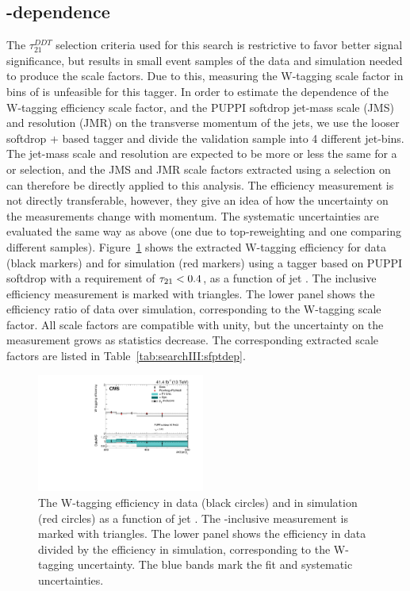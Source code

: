 \subsection{\PT-dependence}
\label{sec:searchIII:vtagpt}
The $\tau_{21}^{DDT}$ selection criteria used for this search is restrictive to favor better signal significance, but results in small event samples of the data and simulation needed to produce the scale factors. Due to this, measuring the W-tagging scale factor in bins of \PT is unfeasible for this tagger. In order to estimate the dependence of the W-tagging efficiency scale factor, and the PUPPI softdrop jet-mass scale (JMS) and resolution (JMR) on the transverse momentum of the jets, we use the looser softdrop + \nsubj based tagger and divide the validation sample into 4 different jet-\PT bins. The jet-mass scale and resolution are expected to be more or less the same for a \nsubj or \ddt selection, and the JMS and JMR scale factors extracted using a selection on \nsubj can therefore be directly applied to this analysis. The efficiency measurement is not directly transferable, however, they give an idea of how the uncertainty on the measurements change with momentum. The systematic uncertainties are evaluated the same way as above (one due to top-\PT reweighting and one comparing different \ttbar samples). Figure~\ref{fig:searchIII:sfvspt} shows the extracted W-tagging efficiency for data (black markers) and for simulation (red markers) using a tagger based on PUPPI softdrop with a requirement of $\tau_{21}<0.4$, as a function of jet \PT. The inclusive efficiency measurement is marked with triangles. The lower panel shows the efficiency ratio of data over simulation, corresponding to the W-tagging scale factor. All scale factors are compatible with unity, but the uncertainty on the measurement grows as statistics decrease. The corresponding extracted scale factors are listed in Table~\ref{tab:searchIII:sfptdep}.
 \begin{figure}[h!]
 \centering
 \includegraphics[width=0.49\textwidth]{figures/vtagging/2017_sf/sd_vPt.pdf}
 \caption{The W-tagging efficiency in data (black circles) and in simulation (red circles) as a function of jet \PT. The \PT-inclusive measurement is marked with triangles. The lower panel shows the efficiency in data divided by the efficiency in simulation, corresponding to the W-tagging uncertainty. The blue bands mark the fit and systematic uncertainties.}
 \label{fig:searchIII:sfvspt}
 \end{figure}
